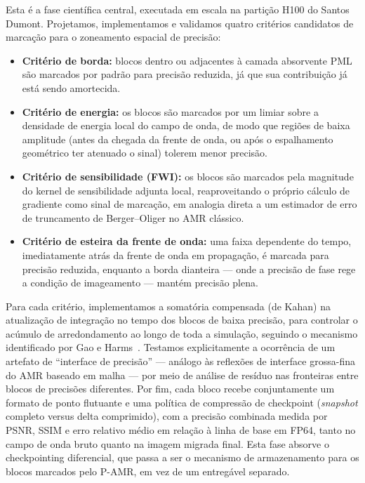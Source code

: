 \documentclass[12pt,a4paper]{article}
\newcommand{\pamr}{P\nobreakdash-AMR}
\begin{document}
Esta é a fase científica central, executada em escala na partição H100 do
Santos Dumont. Projetamos, implementamos e validamos quatro critérios
candidatos de marcação para o zoneamento espacial de precisão:

\begin{itemize}
  \item \textbf{Critério de borda:} blocos dentro ou adjacentes à camada
        absorvente PML são marcados por padrão para precisão reduzida, já que
        sua contribuição já está sendo amortecida.
  \item \textbf{Critério de energia:} os blocos são marcados por um limiar
        sobre a densidade de energia local do campo de onda, de modo que
        regiões de baixa amplitude (antes da chegada da frente de onda, ou
        após o espalhamento geométrico ter atenuado o sinal) tolerem menor
        precisão.
  \item \textbf{Critério de sensibilidade (FWI):} os blocos são marcados pela
        magnitude do kernel de sensibilidade adjunta local, reaproveitando o
        próprio cálculo de gradiente como sinal de marcação, em analogia
        direta a um estimador de erro de truncamento de Berger--Oliger no
        AMR clássico.
  \item \textbf{Critério de esteira da frente de onda:} uma faixa dependente
        do tempo, imediatamente atrás da frente de onda em propagação, é
        marcada para precisão reduzida, enquanto a borda dianteira --- onde a
        precisão de fase rege a condição de imageamento --- mantém precisão
        plena.
\end{itemize}

Para cada critério, implementamos a somatória compensada (de Kahan) na
atualização de integração no tempo dos blocos de baixa precisão, para
controlar o acúmulo de arredondamento ao longo de toda a simulação, seguindo o
mecanismo identificado por Gao e Harms~\cite{gao2023half}. Testamos
explicitamente a ocorrência de um artefato de ``interface de precisão'' ---
análogo às reflexões de interface grossa-fina do AMR baseado em malha --- por
meio de análise de resíduo nas fronteiras entre blocos de precisões
diferentes. Por fim, cada bloco recebe conjuntamente um formato de ponto
flutuante e uma política de compressão de checkpoint (\emph{snapshot}
completo versus delta comprimido), com a precisão combinada medida por PSNR,
SSIM e erro relativo médio em relação à linha de base em FP64, tanto no campo
de onda bruto quanto na imagem migrada final. Esta fase absorve o
checkpointing diferencial, que passa a ser o mecanismo de armazenamento para os
blocos marcados pelo \pamr{}, em vez de um entregável separado.
\end{document}

